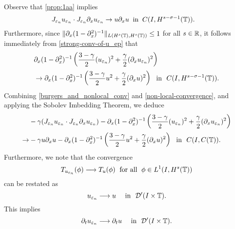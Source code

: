 %
Observe that \cref{prop:1aa} implies
\begin{equation}
\begin{split}
\label{burgers_and_nonlocal_conv}
&  J_{\varepsilon_n} u_{\varepsilon_n} 
\cdot J_{\varepsilon_n} \partial_x u_{\varepsilon_n} 
\to  u \partial_x u \; \; 
\text{in} \; \;
C(I, H^{s-\sigma-1}(\mathbb{T})). 
\end{split}
\end{equation}
%
Furthermore, since $\|\partial_x (1-\partial_x^2)^{-1}\|_{L(H^s(\mathbb{T}), H^s(\mathbb{T}))}
\le 1$ for all $s \in \mathbb{R}$, it follows immediately from
\eqref{strong-conv-of-u_ep} that
\begin{equation}
\begin{split}
& \partial_x(1- \partial_x^2)^{-1} \left( \frac{3-\gamma}{2}
(u_{\varepsilon_n})^2
+ \frac{\gamma}{2} (\partial_x u_{\varepsilon_n})^2 \right )
\\
& \to
\partial_x(1- \partial_x^2)^{-1} \left( \frac{3-\gamma}{2} u^2
+ \frac{\gamma}{2} (\partial_x u)^2 \right ) \ \
\text{in} \ \ C(I, H^{s-\sigma-1}(\mathbb{T})).
\label{non-local-convergence}
\end{split}
\end{equation}
Combining \eqref{burgers_and_nonlocal_conv} and
\eqref{non-local-convergence}, and applying the Sobolev Imbedding
Theorem, we deduce 
\begin{equation}
\begin{split}
& -\gamma (J_{\varepsilon_n} u_{\varepsilon_n} \cdot J_{\varepsilon_n} \partial_x
u_{\varepsilon_n}) - \partial_x(1- \partial_x^2)^{-1} \left( \frac{3-\gamma}{2}
(u_{\varepsilon_n})^2
+ \frac{\gamma}{2} (\partial_x u_{\varepsilon_n})^2 \right )
\\
\to & -\gamma u \partial_x u -
\partial_x(1- \partial_x^2)^{-1} \left( \frac{3-\gamma}{2} u^2
+ \frac{\gamma}{2} (\partial_x u)^2 \right ) \ \
\text{in} \ \ C(I, C(\mathbb{T})).
\label{loc-non-loc-tog}
\end{split}
\end{equation}
Furthermore, we note that the convergence  
%
\begin{equation}
\label{weak-conv-2}
T_{u_{\varepsilon_n}}(\phi)  \longrightarrow  T_u(\phi) \;
\ \text{for all} \  \;  \phi \in L^1(I, H^{s}(\mathbb{T}))
\end{equation}
%
can be restated as 
%
\begin{equation}
u_{\varepsilon_n}  \longrightarrow  u
\quad
\ \text{in} \   \,\,
\mathcal{D}'(I\times \mathbb{T}).
\end{equation}
%
This implies 
%
\begin{equation}
\label{distib-conv-2}
\partial_tu_{\varepsilon_n}  \longrightarrow  \partial_tu
\quad
\ \text{in} \   \,\, \mathcal{D}'(I\times \mathbb{T}).
\end{equation}
